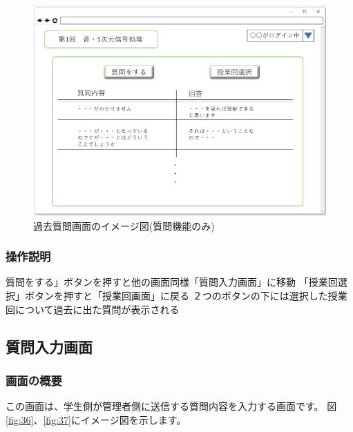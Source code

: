 \begin{figure}[htbp]
\begin{center}
  \includegraphics[width=1\linewidth,clip]{./img/35.png}
  \caption{過去質問画面のイメージ図(質問機能のみ)}\label{fig:35}
\end{center}
\end{figure}

\subsubsection{操作説明}
質問をする」ボタンを押すと他の画面同様「質問入力画面」に移動
「授業回選択」ボタンを押すと「授業回画面」に戻る
２つのボタンの下には選択した授業回について過去に出た質問が表示される

\newpage



\subsection{質問入力画面}
\subsubsection{画面の概要}
この画面は、学生側が管理者側に送信する質問内容を入力する画面です。
図\ref{fig:36}、\ref{fig:37}にイメージ図を示します。

